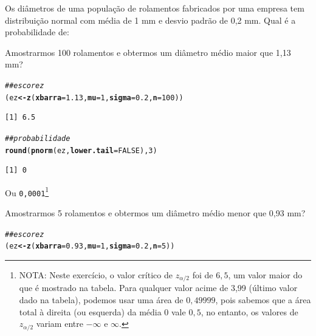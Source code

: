 \documentclass[a4paper,11pt,fleqn]{article}\usepackage[]{graphicx}\usepackage[]{color}
\makeatletter
\newcommand{\hlnum}[1]{\textcolor[rgb]{0,0,0}{#1}}%
\newcommand{\hlcom}[1]{\textcolor[rgb]{0.4,0.4,0.4}{\textit{#1}}}%
\newcommand{\hlstd}[1]{\textcolor[rgb]{0,0,0}{#1}}%
\newcommand{\hlkwb}[1]{\textcolor[rgb]{0,0,0}{\textbf{#1}}}%
\newcommand{\hlkwc}[1]{\textcolor[rgb]{0,0,0}{\textbf{#1}}}%
\newcommand{\hlkwd}[1]{\textcolor[rgb]{0,0,0}{\textbf{#1}}}%
\newenvironment{kframe}{%
 \def\at@end@of@kframe{}%
 \ifinner\ifhmode%
  \def\at@end@of@kframe{\end{minipage}}%
  \begin{minipage}{\columnwidth}%
 \fi\fi%
 \def\FrameCommand##1{\hskip\@totalleftmargin \hskip-\fboxsep
 \colorbox{shadecolor}{##1}\hskip-\fboxsep
     \hskip-\linewidth \hskip-\@totalleftmargin \hskip\columnwidth}%
 \MakeFramed {\advance\hsize-\width
   \@totalleftmargin\z@ \linewidth\hsize
   \@setminipage}}%
 {\par\unskip\endMakeFramed%
 \at@end@of@kframe}
\newenvironment{knitrout}{}{} %
\theoremstyle{definition}
\makeatother
\begin{document}
\begin{compactenum}[1.]
\item Os diâmetros de uma população de rolamentos fabricados por uma
  empresa tem distribuição normal com média de 1 mm e desvio padrão de
  0,2 mm. Qual é a probabilidade de:
  \begin{compactenum}
  \item Amostrarmos 100 rolamentos e obtermos um diâmetro médio maior
    que 1,13 mm?
\begin{knitrout}\small
{}\color{fgcolor}\begin{kframe}
\begin{alltt}
\hlcom{## escore z}
\hlstd{(ez} \hlkwb{<-} \hlkwd{z}\hlstd{(}\hlkwc{xbarra} \hlstd{=} \hlnum{1.13}\hlstd{,} \hlkwc{mu} \hlstd{=} \hlnum{1}\hlstd{,} \hlkwc{sigma} \hlstd{=} \hlnum{0.2}\hlstd{,} \hlkwc{n} \hlstd{=} \hlnum{100}\hlstd{))}
\end{alltt}
\begin{verbatim}
[1] 6.5
\end{verbatim}
\begin{alltt}
\hlcom{## probabilidade}
\hlkwd{round}\hlstd{(}\hlkwd{pnorm}\hlstd{(ez,} \hlkwc{lower.tail} \hlstd{=} \hlnum{FALSE}\hlstd{),} \hlnum{3}\hlstd{)}
\end{alltt}
\begin{verbatim}
[1] 0
\end{verbatim}
\end{kframe}
\end{knitrout}
Ou \texttt{0,0001}\footnote{NOTA: Neste exercício, o valor crítico de
    $z_{\alpha/2}$ foi de $6,5$, um valor maior do que é mostrado na
  tabela. Para qualquer valor acime de 3,99 (último valor dado na
  tabela), podemos usar uma área de $0,49999$, pois sabemos que a área
  total à direita (ou esquerda) da média 0 vale $0,5$, no entanto, os
  valores de $z_{\alpha/2}$ variam entre $-\infty$ e $\infty$.}
    \item Amostrarmos 5 rolamentos e obtermos um diâmetro médio menor que 0,93
    mm?
\begin{knitrout}\small
{}\color{fgcolor}\begin{kframe}
\begin{alltt}
\hlcom{## escore z}
\hlstd{(ez} \hlkwb{<-} \hlkwd{z}\hlstd{(}\hlkwc{xbarra} \hlstd{=} \hlnum{0.93}\hlstd{,} \hlkwc{mu} \hlstd{=} \hlnum{1}\hlstd{,} \hlkwc{sigma} \hlstd{=} \hlnum{0.2}\hlstd{,} \hlkwc{n} \hlstd{=} \hlnum{5}\hlstd{))}
\end{alltt}

\end{kframe}
\end{knitrout}
\end{compactenum}
\end{compactenum}
\end{document}
